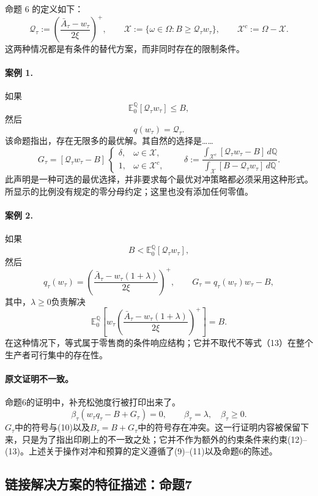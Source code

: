 \documentclass{article}
\begin{document}
命题 6 的定义如下：
\[
\mathscr Q_\tau:=\left(\frac{\bar A_\tau-w_\tau}{2\xi}\right)^+,
\qquad
\mathscr X:=\{\omega\in\Omega:B\geqslant\mathscr Q_\tau w_\tau\},
\qquad
\mathscr X^c:=\Omega-\mathscr X.
\]
这两种情况都是有条件的替代方案，而非同时存在的限制条件。

\paragraph{案例 1.}
如果
\[
\mathbb E_0^{\mathbb Q}[\mathscr Q_\tau w_\tau]\leqslant B,
\]
然后
\[
q(w_\tau)=\mathscr Q_\tau.
\]
该命题指出，存在无限多的最优解。其自然的选择是……
\[
G_\tau=[\mathscr Q_\tau w_\tau-B]\,
\begin{cases}
\delta,&\omega\in\mathscr X,\\
1,&\omega\in\mathscr X^c,
\end{cases}
\qquad
\delta:=
\frac{\displaystyle\int_{\mathscr X^c}
 [\mathscr Q_\tau w_\tau-B]\,d\mathbb Q}
{\displaystyle\int_{\mathscr X}
 [B-\mathscr Q_\tau w_\tau]\,d\mathbb Q}.
\]
此声明是一种可选的最优选择，并非要求每个最优对冲策略都必须采用这种形式。所显示的比例没有规定的零分母约定；这里也没有添加任何零值。

\paragraph{案例 2.}
如果
\[
B<\mathbb E_0^{\mathbb Q}[\mathscr Q_\tau w_\tau],
\]
然后
\[
q_\tau(w_\tau)=
\left(\frac{\bar A_\tau-w_\tau(1+\lambda)}{2\xi}\right)^+,
\qquad
G_\tau=q_\tau(w_\tau)w_\tau-B,
\]
其中，$\lambda\geqslant0$负责解决
\[
\mathbb E_0^{\mathbb Q}\left[
 w_\tau\left(\frac{\bar A_\tau-w_\tau(1+\lambda)}{2\xi}\right)^+
\right]=B.
\]
在这种情况下，等式属于零售商的条件响应结构；它并不取代不等式（13）在整个生产者可行集中的存在性。

\paragraph{原文证明不一致。}
命题6的证明中，补充松弛度行被打印出来了。
\[
\beta_\tau(w_\tau q_\tau-B+G_\tau)=0,
\qquad \beta_\tau=\lambda,\quad \beta_\tau\geqslant0.
\]
$G_\tau$中的符号与(10)以及$B_\tau=B+G_\tau$中的符号存在冲突。这一行证明内容被保留下来，只是为了指出印刷上的不一致之处；它并不作为额外的约束条件来约束(12)--(13)。上述关于操作对冲和预算的定义遵循了(9)--(11)以及命题6的陈述。

\subsection*{链接解决方案的特征描述：命题7}
\end{document}
